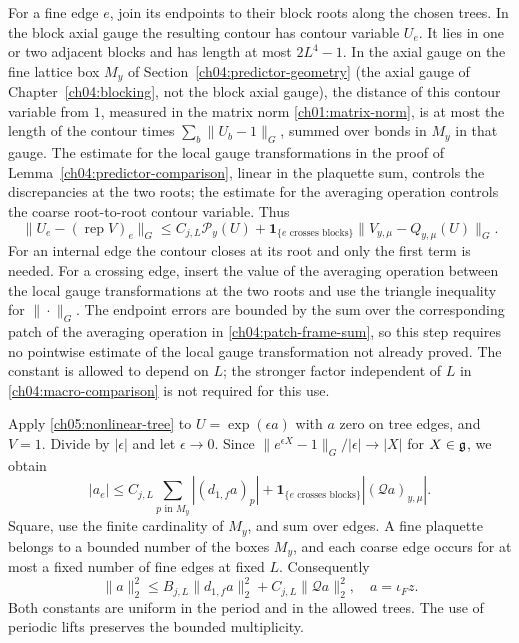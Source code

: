 For a fine edge $e$, join its endpoints to their block roots along the
chosen trees. In the block axial gauge the resulting contour has contour variable $U_e$.
It lies in one or two adjacent blocks and has length at most $2L^4-1$.
In the axial gauge on the fine lattice box $M_y$ of Section~\ref{ch04:predictor-geometry} (the axial gauge of Chapter~\ref{ch04:blocking}, not the block axial gauge), the
distance of this contour variable from $1$, measured in the matrix norm
\eqref{ch01:matrix-norm}, is at most the length of the contour times
$\sum_b\|U_b-1\|_G$, summed over bonds in $M_y$ in that gauge. The
estimate for the local gauge transformations in the proof of Lemma~\ref{ch04:predictor-comparison}, linear in the plaquette sum, controls the discrepancies at the two roots;
the estimate for the averaging operation controls the coarse root-to-root contour variable. Thus
\begin{equation}
 \|U_e-(\operatorname{rep}V)_e\|_G
 \le C_{j,L}\mathcal P_y(U)
       +\mathbf1_{\{e\text{ crosses blocks}\}}
                            \|V_{y,\mu}-Q_{y,\mu}(U)\|_G.
 \label{ch05:nonlinear-tree}
\end{equation}
For an internal edge the contour closes at its root and only the first term
is needed. For a crossing edge, insert the value of the averaging operation between the
local gauge transformations at the two roots and use the triangle inequality for $\|\cdot\|_G$. The endpoint errors
are bounded by the sum over the corresponding patch of the averaging operation in \eqref{ch04:patch-frame-sum}, so this step
requires no pointwise estimate of the local gauge transformation not already proved. The constant is
allowed to depend on $L$; the stronger factor independent of $L$ in
\eqref{ch04:macro-comparison} is not required for this use.

Apply \eqref{ch05:nonlinear-tree} to $U=\exp(\epsilon a)$ with $a$ zero
on tree edges, and $V=1$. Divide by $|\epsilon|$ and let $\epsilon\to0$.
Since $\|e^{\epsilon X}-1\|_G/|\epsilon|\to |X|$ for $X\in\mathfrak g$, we obtain
\[
 |a_e|\le C_{j,L}\sum_{p\text{ in }M_y}|(d_{1,f}a)_p|
       +\mathbf1_{\{e\text{ crosses blocks}\}}|(\mathcal Qa)_{y,\mu}|.
\]
Square, use the finite cardinality of $M_y$, and sum over edges. A fine
plaquette belongs to a bounded number of the boxes $M_y$, and each coarse
edge occurs for at most a fixed number of fine edges at fixed $L$.
Consequently
\begin{equation}
 \|a\|_2^2\le B_{j,L}\|d_{1,f}a\|_2^2
                       +C_{j,L}\|\mathcal Qa\|_2^2,
 \quad a=\iota_Fz.
 \label{ch05:tree-comparison}
\end{equation}
Both constants are uniform in the period and in the allowed trees.
The use of periodic lifts preserves the bounded multiplicity.

